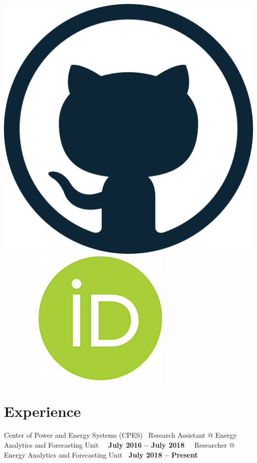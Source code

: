 \documentclass{mycv}
\begin{document}
\begin{center}
	\href{https://github.com/jrsa2012}{\includegraphics[scale=0.042]{figs/github_logo.png}}
	\ \ \ \ \ \ \ \ \ \
	\href{https://orcid.org/0000-0001-8170-8235}{\includegraphics[scale=0.088]{figs/orcid_logo.png}}
	
\end{center}



\section{Experience}

\vspace{0.3cm}

{Center of Power and Energy Systems (CPES) }
{\textbullet~Research Assistant \hspace{0.005cm} @ \hspace{0.02cm} Energy Analytics and Forecasting Unit \hfill ~\textbf{\ July 2016 -- July 2018\ }}
{\textbullet~Researcher \hspace{1.23cm}  @ \hspace{0.02cm} Energy Analytics and Forecasting Unit \hfill \textbf{ \ July 2018 -- Present\ }}
\end{document}
